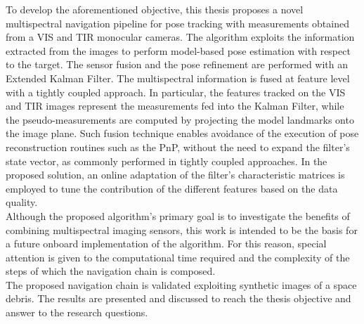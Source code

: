 To develop the aforementioned objective, this thesis proposes a novel multispectral navigation pipeline for pose tracking with measurements obtained from a VIS and TIR monocular cameras. The algorithm exploits the information extracted from the images to perform model-based pose estimation with respect to the target. The sensor fusion and the pose refinement are performed with an Extended Kalman Filter. The multispectral information is fused at feature level with a tightly coupled approach. In particular, the features tracked on the VIS and TIR images represent the measurements fed into the Kalman Filter, while the pseudo-measurements are computed by projecting the model landmarks onto the image plane. Such fusion technique enables avoidance of the execution of pose reconstruction routines such as the PnP, without the need to expand the filter's state vector, as commonly performed in tightly coupled approaches. In the proposed solution, an online adaptation of the filter's characteristic matrices is employed to tune the contribution of the different features based on the data quality.\\
Although the proposed algorithm's primary goal is to investigate the benefits of combining multispectral imaging sensors, this work is intended to be the basis for a future onboard implementation of the algorithm. For this reason, special attention is given to the computational time required and the complexity of the steps of which the navigation chain is composed.\\
The proposed navigation chain is validated exploiting synthetic images of a space debris. The results are presented and discussed to reach the thesis objective and answer to the research questions.\\
